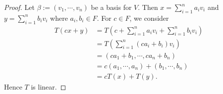 \begin{Exercise}
	\begin{proof}
		Let $\beta := (v_1,\cdots, v_n)$ be a basis for $V$. Then $x = \sum_{i=1}^{n} a_i v_i$ and $y = \sum_{i=1}^{n} b_i v_i$ where $a_i, b_i \in F$. For $c\in F$, we consider
		\begin{align*}
		T(c x+y)
		&= T\left(c+\sum_{i=1}^{n} a_i v_i + \sum_{i=1}^{n} b_i v_i \right) \\
		&= T\left(\sum_{i=1}^{n} (c a_i + b_i)v_i \right) \\
		&= (c a_1 + b_1, \cdots, c a_n + b_n) \\
		&= c (a_1,\cdots, a_n) + (b_1,\cdots, b_n) \\
		&= c T(x) + T(y).
		\end{align*}
		Hence $T$ is linear.
	\end{proof}
\end{Exercise}
